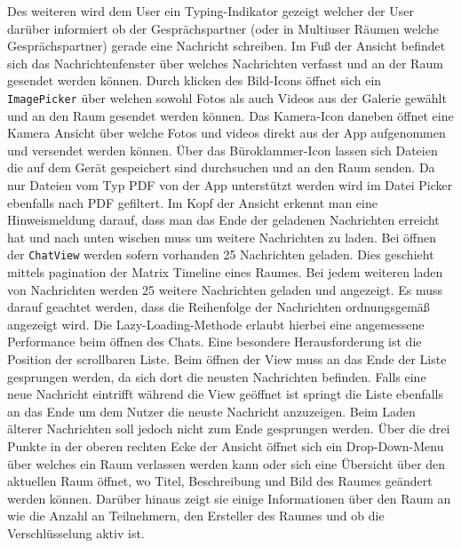     Des weiteren wird dem User ein Typing-Indikator gezeigt welcher der User darüber informiert ob der Gesprächspartner (oder in Multiuser Räumen welche Gesprächspartner) gerade eine Nachricht schreiben.
    Im Fuß der Ansicht befindet sich das Nachrichtenfenster über welches Nachrichten verfasst und an der Raum gesendet werden können.
    Durch klicken des Bild-Icons öffnet sich ein \texttt{ImagePicker} über welchen sowohl Fotos als auch Videos aus der Galerie gewählt und an den Raum gesendet werden können.
    Das Kamera-Icon daneben öffnet eine Kamera Ansicht über welche Fotos und videos direkt aus der App aufgenommen und versendet werden können.
    Über das Büroklammer-Icon lassen sich Dateien die auf dem Gerät gespeichert sind durchsuchen und an den Raum senden.
    Da nur Dateien vom Typ PDF von der App unterstützt werden wird im Datei Picker ebenfalls nach PDF gefiltert.
    Im Kopf der Ansicht erkennt man eine Hinweismeldung darauf, dass man das Ende der geladenen Nachrichten erreicht hat und nach unten wischen muss um weitere Nachrichten zu laden.
    Bei öffnen der \texttt{ChatView} werden sofern vorhanden 25 Nachrichten geladen.
    Dies geschieht mittels pagination der Matrix Timeline eines Raumes.
    Bei jedem weiteren laden von Nachrichten werden 25 weitere Nachrichten geladen und angezeigt.
    Es muss darauf geachtet werden, dass die Reihenfolge der Nachrichten ordnungsgemäß angezeigt wird.
    Die Lazy-Loading-Methode erlaubt hierbei eine angemessene Performance beim öffnen des Chats.
    Eine besondere Herausforderung ist die Position der scrollbaren Liste.
    Beim öffnen der View muss an das Ende der Liste gesprungen werden, da sich dort die neusten Nachrichten befinden.
    Falls eine neue Nachricht eintrifft während die View geöffnet ist springt die Liste ebenfalls an das Ende um dem Nutzer die neuste Nachricht anzuzeigen.
    Beim Laden älterer Nachrichten soll jedoch nicht zum Ende gesprungen werden.
    Über die drei Punkte in der oberen rechten Ecke der Ansicht öffnet sich ein Drop-Down-Menu über welches ein Raum verlassen werden kann oder sich eine Übersicht über den aktuellen Raum öffnet, wo Titel, Beschreibung und Bild des Raumes geändert werden können.
    Darüber hinaus zeigt sie einige Informationen über den Raum an wie die Anzahl an Teilnehmern, den Ersteller des Raumes und ob die Verschlüsselung aktiv ist.

    \newpage
